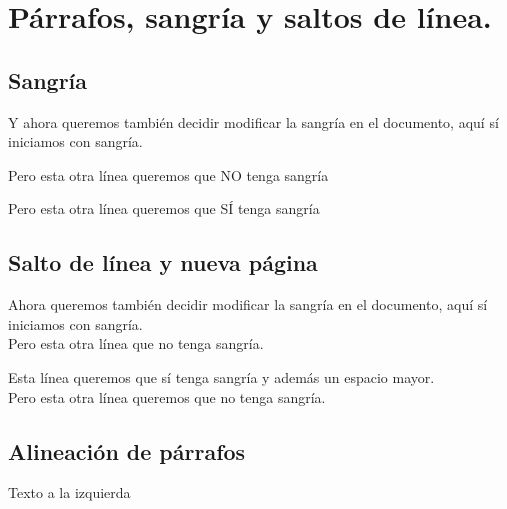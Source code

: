 \documentclass[12pt]{article}
\begin{document}
\section{Párrafos, sangría y saltos de línea.}

\subsection{Sangría}

\noindent %
Y ahora queremos también decidir modificar la sangría en el documento, aquí sí iniciamos con sangría.

\noindent Pero esta otra línea queremos que NO tenga sangría

Pero esta otra línea queremos que SÍ tenga sangría

\subsection{Salto de línea y nueva página}

Ahora queremos también decidir modificar la sangría en el documento, aquí sí iniciamos con sangría. \\ 
Pero esta otra línea que no tenga sangría.
\par 
Esta línea queremos que sí tenga sangría y además un espacio mayor. \\[0.5cm] 
Pero esta otra línea queremos que no tenga sangría.

\subsection{Alineación de párrafos}

\begin{flushleft}
Texto a la izquierda
\end{flushleft}
\end{document}
